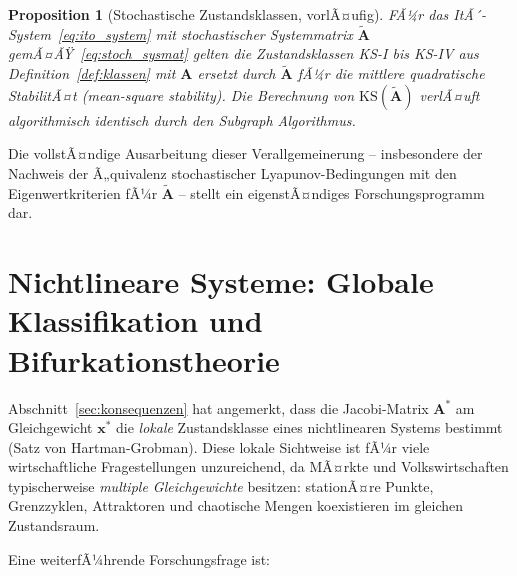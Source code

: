 ﻿\documentclass[12pt, a4paper, titlepage]{report}
\newtheorem{proposition}[theorem]{Proposition}
\theoremstyle{definition}
\theoremstyle{remark}
\newcommand{\vx}{\bm{x}}
\newcommand{\vA}{\bm{A}}
\newcommand{\KS}{\mathrm{KS}}
\begin{document}
\begin{proposition}[Stochastische Zustandsklassen, vorlÃ¤ufig]
FÃ¼r das ItÃ´-System~\eqref{eq:ito_system} mit stochastischer Systemmatrix $\tilde{\vA}$
gemÃ¤ÃŸ~\eqref{eq:stoch_sysmat} gelten die Zustandsklassen KS-I bis KS-IV aus
Definition~\ref{def:klassen} mit $\vA$ ersetzt durch $\tilde{\vA}$ fÃ¼r die
mittlere quadratische StabilitÃ¤t (mean-square stability). Die Berechnung von
$\KS(\tilde{\vA})$ verlÃ¤uft algorithmisch identisch durch den Subgraph Algorithmus.
\end{proposition}

\noindent
Die vollstÃ¤ndige Ausarbeitung dieser Verallgemeinerung -- insbesondere der Nachweis
der Ã„quivalenz stochastischer Lyapunov-Bedingungen mit den Eigenwertkriterien fÃ¼r
$\tilde{\vA}$ -- stellt ein eigenstÃ¤ndiges Forschungsprogramm dar.

\section{Nichtlineare Systeme: Globale Klassifikation und Bifurkationstheorie}
\label{subsec:nichtlinear}

Abschnitt~\ref{sec:konsequenzen} hat angemerkt, dass die Jacobi-Matrix $\vA^*$ am
Gleichgewicht $\vx^*$ die \emph{lokale} Zustandsklasse eines nichtlinearen Systems
bestimmt (Satz von Hartman-Grobman). Diese lokale Sichtweise ist fÃ¼r viele wirtschaftliche
Fragestellungen unzureichend, da MÃ¤rkte und Volkswirtschaften typischerweise
\emph{multiple Gleichgewichte} besitzen: stationÃ¤re Punkte, Grenzzyklen, Attraktoren und
chaotische Mengen koexistieren im gleichen Zustandsraum.

Eine weiterfÃ¼hrende Forschungsfrage ist:
\end{document}
